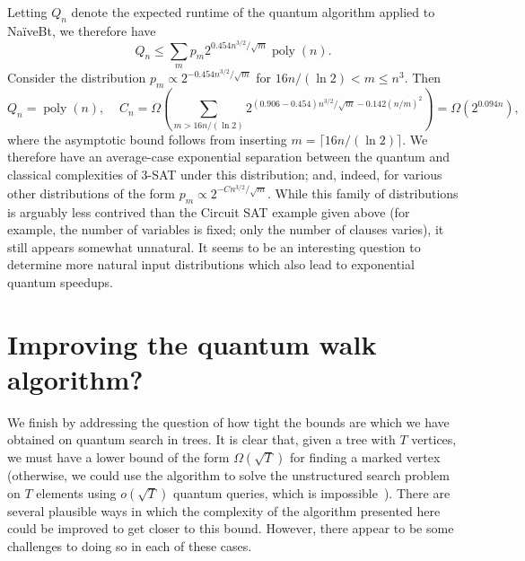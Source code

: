 \documentclass[11pt]{article}
\DeclareMathOperator{\poly}{poly}
\begin{document}
Letting $Q_n$ denote the expected runtime of the quantum algorithm applied to Na\"iveBt, we therefore have
%
\[ Q_n \le \sum_m p_m 2^{0.454 n^{3/2}/\sqrt{m}} \poly(n). \]
%
Consider the distribution $p_m \propto 2^{-0.454 n^{3/2}/\sqrt{m}}$ for $16n/(\ln 2) < m \le n^3$. Then
%
\[ Q_n = \poly(n),\;\;\;\; C_n = \Omega( \sum_{m > 16n/(\ln 2)} 2^{(0.906-0.454) n^{3/2}/\sqrt{m} - 0.142 (n/m)^2 } ) = \Omega(2^{0.094n}),  \]
%
where the asymptotic bound follows from inserting $m = \lceil 16n/(\ln 2) \rceil$. We therefore have an average-case exponential separation between the quantum and classical complexities of 3-SAT under this distribution; and, indeed, for various other distributions of the form $p_m \propto 2^{-Cn^{3/2}/\sqrt{m}}$. While this family of distributions is arguably less contrived than the Circuit SAT example given above (for example, the number of variables is fixed; only the number of clauses varies), it still appears somewhat unnatural. It seems to be an interesting question to determine more natural input distributions which also lead to exponential quantum speedups.


\section{Improving the quantum walk algorithm?}
\label{sec:barriers}

We finish by addressing the question of how tight the bounds are which we have obtained on quantum search in trees. It is clear that, given a tree with $T$ vertices, we must have a lower bound of the form $\Omega(\sqrt{T})$ for finding a marked vertex (otherwise, we could use the algorithm to solve the unstructured search problem on $T$ elements using $o(\sqrt{T})$ quantum queries, which is impossible~\cite{bennett97}). There are several plausible ways in which the complexity of the algorithm presented here could be improved to get closer to this bound. However, there appear to be some challenges to doing so in each of these cases.
\end{document}

